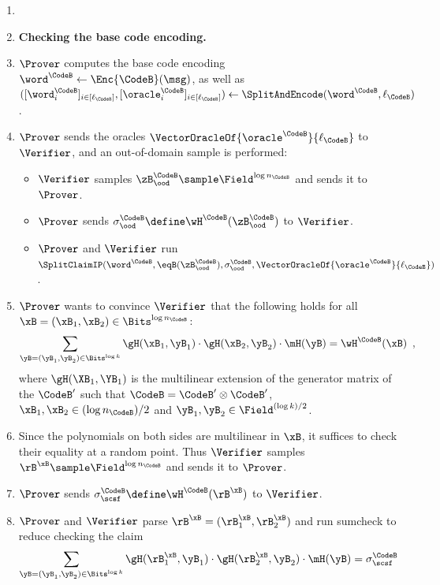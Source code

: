 \begin{tcolorbox}[breakable, enhanced, colback=white, boxrule=0.65pt]
\begin{enumerate}[nolistsep]
        \item[] \item[] \textbf{Checking the base code encoding.}
        \item $\Prover$ computes the base code encoding $\word^{\CodeB} \gets \Enc{\CodeB}(\msg)$, as well as $([\word^{\CodeB}_i]_{i \in [\ell_{\CodeB}]}, [\oracle^{\CodeB}_i]_{i \in [\ell_{\CodeB}]}) \gets \SplitAndEncode(\word^{\CodeB}, \ell_{\CodeB})$.
        \item $\Prover$ sends the oracles $\VectorOracleOf{\oracle^{\CodeB}}{\ell_{\CodeB}}$ to $\Verifier$, and an out-of-domain sample is performed:
        \begin{itemize}[nolistsep]
            \item $\Verifier$ samples $\zB^{\CodeB}_{\ood} \sample \Field^{\log n_{\CodeB}}$ and sends it to $\Prover$.
            \item $\Prover$ sends $\sigma^{\CodeB}_{\ood} \define \wH^{\CodeB}(\zB^{\CodeB}_{\ood})$ to $\Verifier$.
            \item $\Prover$ and $\Verifier$ run $\SplitClaimIP(\word^{\CodeB}, \eqB(\zB^{\CodeB}_{\ood}), \sigma^{\CodeB}_{\ood}, \VectorOracleOf{\oracle^{\CodeB}}{\ell_{\CodeB}})$.
        \end{itemize}
        \item $\Prover$ wants to convince $\Verifier$ that the following holds for all $\xB = (\xB_1, \xB_2) \in \Bits^{\log n_{\CodeB}}$:
        \[
            \sum_{\yB = (\yB_1, \yB_2) \in \Bits^{\log k}} \gH(\xB_1, \yB_1) \cdot \gH(\xB_2, \yB_2) \cdot \mH(\yB) = \wH^{\CodeB}(\xB) \enspace,
        \]
        where $\gH(\XB_1, \YB_1)$ is the multilinear extension of the generator matrix of the $\CodeB'$ such that $\CodeB = \CodeB' \otimes \CodeB'$, $\xB_1, \xB_2 \in (\log n_{\CodeB})/2$ and $\yB_1, \yB_2 \in \Field^{(\log k)/2}$.
        \item Since the polynomials on both sides are multilinear in $\xB$, it suffices to check their equality at a random point. Thus $\Verifier$ samples $\rB^{\xB} \sample \Field^{\log n_{\CodeB}}$ and sends it to $\Prover$.
        \item $\Prover$ sends $\sigma^{\CodeB}_{\scsf} \define \wH^{\CodeB}(\rB^{\xB})$ to $\Verifier$.
        \item $\Prover$ and $\Verifier$ parse $\rB^{\xB} = (\rB^{\xB}_1, \rB^{\xB}_2)$ and run sumcheck to reduce checking the claim
        \begin{align*}
            \sum_{\yB = (\yB_1, \yB_2) \in \Bits^{\log k}} \gH(\rB^{\xB}_1, \yB_1) \cdot \gH(\rB^{\xB}_2, \yB_2) \cdot \mH(\yB) = \sigma^{\CodeB}_{\scsf}

\end{align*}
\end{enumerate}
\end{tcolorbox}
